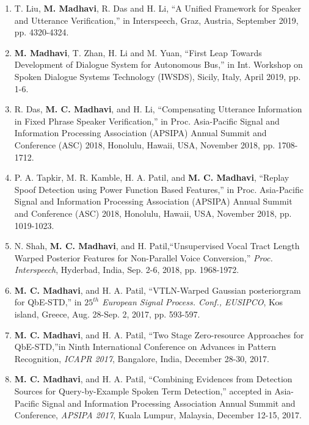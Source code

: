 \documentclass[10pt]{article}
\begin{document}
\begin{enumerate}[resume]
\item T. Liu, \textbf{M. Madhavi}, R. Das and H. Li, ``A Unified Framework for Speaker and Utterance Verification,'' in Interspeech, Graz, Austria, September 2019, pp. 4320-4324.

				
\item \textbf{M. Madhavi}, T. Zhan, H. Li and M. Yuan, ``First Leap Towards Development of Dialogue System for Autonomous Bus,'' in Int. Workshop on Spoken Dialogue Systems Technology (IWSDS),  Sicily, Italy, April 2019, pp. 1-6.

\item R. Das, \textbf{M. C. Madhavi}, and H. Li, ``Compensating Utterance Information in Fixed Phrase Speaker Verification,'' in Proc. Asia-Pacific Signal and Information Processing Association (APSIPA) Annual Summit and Conference (ASC) 2018, Honolulu, Hawaii, USA, November 2018, pp. 1708-1712.
				
\item P. A. Tapkir, M. R. Kamble, H. A. Patil, and  \textbf{M. C. Madhavi}, ``Replay Spoof Detection using Power Function Based Features,'' in Proc. Asia-Pacific Signal and Information Processing Association (APSIPA) Annual Summit and Conference (ASC) 2018, Honolulu, Hawaii, USA, November 2018, pp. 1019-1023.
				
\item N. Shah, \textbf{M. C. Madhavi}, and H. Patil,``Unsupervised Vocal Tract Length Warped Posterior Features for Non-Parallel Voice Conversion,'' \textit{Proc. Interspeech}, Hyderbad, India, Sep. 2-6, 2018, pp. 1968-1972.
				
\item  \textbf{M. C. Madhavi}, and H. A. Patil, ``VTLN-Warped Gaussian posteriorgram for QbE-STD,'' in \textit{$25^{th}$ European	Signal Process. Conf., EUSIPCO}, Kos island, Greece, Aug. 28-Sep. 2, 2017, pp. 593-597.

\item \textbf{M. C. Madhavi}, and H. A. Patil, ``Two Stage Zero-resource Approaches for QbE-STD,''in Ninth International Conference on Advances in Pattern Recognition, \textit{ICAPR 2017}, Bangalore, India, December 28-30, 2017.

\item 	\textbf{M. C. Madhavi}, and H. A. Patil, ``Combining Evidences from Detection Sources for Query-by-Example Spoken Term Detection,'' accepted in Asia-Pacific Signal and Information Processing Association Annual Summit and Conference, \textit{APSIPA 2017}, Kuala Lumpur, Malaysia, December 12-15, 2017. 


\end{enumerate}
\end{document}
